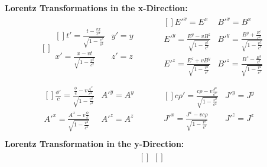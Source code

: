 \documentclass[a4]{article}
\begin{document}
    \begin{framed}
        \noindent
        \textbf{Lorentz Transformations in the x-Direction:}
        \begin{equation}
            \begin{aligned}[]
                \boxed{
                    \begin{aligned}[]
                    t' = \frac{t - \frac{vx}{c^2}}{\sqrt{1 - \frac{v^2}{c^2}}} & y' = y \\
                    x' = \frac{x - vt}{\sqrt{1 - \frac{v^2}{c^2}}} & z' = z
                    \end{aligned}
                } \quad & \quad
                \begin{aligned}[]
                    E'^{x} = E^{x} & B'^{x} = B^{x} \\
                    E'^{y} = \frac{E^{y} - v B^{z}}{\sqrt{1 - \frac{v^2}{c^2}}} & B'^{y} = \frac{B^{y} + \frac{E^z}{c^2}}{\sqrt{1 - \frac{v^2}{c^2}}} \\
                    E'^{z} = \frac{E^{z} + v B^{y}}{\sqrt{1 - \frac{v^2}{c^2}}} & B'^{z} = \frac{B^{z} - \frac{E^y}{c^2}}{\sqrt{1 - \frac{v^2}{c^2}}} \\
                \end{aligned} \\
                \begin{aligned}[]
                    \frac{\phi'}{c} = \frac{\frac{\phi}{c} - v \frac{A^x}{c^2}}{\sqrt{1 - \frac{v^2}{c^2}}} & A'^{y} = A^{y} \\
                    A'^{x} = \frac{A^x - v \frac{\phi}{c}}{\sqrt{1 - \frac{v^2}{c^2}}} & A'^{z} = A^{z}
                \end{aligned} \quad & \quad
                \begin{aligned}[]
                    c\rho' = \frac{c \rho - v \frac{J^x}{c^2}}{\sqrt{1 - \frac{v^2}{c^2}}} & J'^{y} = J^{y} \\
                    J'^{x} = \frac{J^x - v c \rho}{\sqrt{1 - \frac{v^2}{c^2}}} & J'^{z} = J^{z}
                \end{aligned} \\
            \end{aligned}
        \end{equation}
        \textbf{Lorentz Transformation in the y-Direction:}
        \begin{equation}
            \begin{aligned}[]
                \boxed{
                    \begin{aligned}[]

\end{aligned}}
\end{aligned}
\end{equation}
\end{framed}
\end{document}
